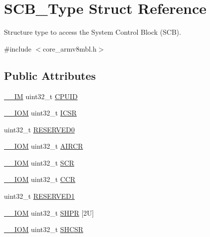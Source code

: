 \hypertarget{struct_s_c_b___type}{}\section{S\+C\+B\+\_\+\+Type Struct Reference}
\label{struct_s_c_b___type}


Structure type to access the System Control Block (S\+CB).  




{\ttfamily \#include $<$core\+\_\+armv8mbl.\+h$>$}

\subsection*{Public Attributes}
\begin{DoxyCompactItemize}
\item 
\hyperlink{core__sc300_8h_a4cc1649793116d7c2d8afce7a4ffce43}{\+\_\+\+\_\+\+IM} uint32\+\_\+t \hyperlink{struct_s_c_b___type_a21e08d546d8b641bee298a459ea73e46}{C\+P\+U\+ID}
\item 
\hyperlink{core__sc300_8h_ab6caba5853a60a17e8e04499b52bf691}{\+\_\+\+\_\+\+I\+OM} uint32\+\_\+t \hyperlink{struct_s_c_b___type_a0ca18ef984d132c6bf4d9b61cd00f05a}{I\+C\+SR}
\item 
uint32\+\_\+t \hyperlink{struct_s_c_b___type_a10960cdc703f661c83a237d9c69db23c}{R\+E\+S\+E\+R\+V\+E\+D0}
\item 
\hyperlink{core__sc300_8h_ab6caba5853a60a17e8e04499b52bf691}{\+\_\+\+\_\+\+I\+OM} uint32\+\_\+t \hyperlink{struct_s_c_b___type_ad3e5b8934c647eb1b7383c1894f01380}{A\+I\+R\+CR}
\item 
\hyperlink{core__sc300_8h_ab6caba5853a60a17e8e04499b52bf691}{\+\_\+\+\_\+\+I\+OM} uint32\+\_\+t \hyperlink{struct_s_c_b___type_a3a4840c6fa4d1ee75544f4032c88ec34}{S\+CR}
\item 
\hyperlink{core__sc300_8h_ab6caba5853a60a17e8e04499b52bf691}{\+\_\+\+\_\+\+I\+OM} uint32\+\_\+t \hyperlink{struct_s_c_b___type_a2d6653b0b70faac936046a02809b577f}{C\+CR}
\item 
uint32\+\_\+t \hyperlink{struct_s_c_b___type_adddd65958c1c4c0301f62ede0a9bf12e}{R\+E\+S\+E\+R\+V\+E\+D1}
\item 
\hyperlink{core__sc300_8h_ab6caba5853a60a17e8e04499b52bf691}{\+\_\+\+\_\+\+I\+OM} uint32\+\_\+t \hyperlink{struct_s_c_b___type_ac6259676cd7892a1b62f3fa7c0930780}{S\+H\+PR} \mbox{[}2\+U\mbox{]}
\item 
\hyperlink{core__sc300_8h_ab6caba5853a60a17e8e04499b52bf691}{\+\_\+\+\_\+\+I\+OM} uint32\+\_\+t \hyperlink{struct_s_c_b___type_a7b5ae9741a99808043394c4743b635c4}{S\+H\+C\+SR}

\end{DoxyCompactItemize}
